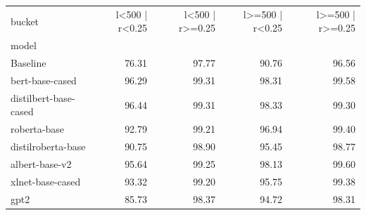 \begin{tabular}{lrrrr}
\toprule
bucket & l<500 | r<0.25 & l<500 | r>=0.25 & l>=500 | r<0.25 & l>=500 | r>=0.25 \\
model &  &  &  &  \\
\midrule
Baseline & 76.31 & 97.77 & 90.76 & 96.56 \\
bert-base-cased & 96.29 & 99.31 & 98.31 & 99.58 \\
distilbert-base-cased & 96.44 & 99.31 & 98.33 & 99.30 \\
roberta-base & 92.79 & 99.21 & 96.94 & 99.40 \\
distilroberta-base & 90.75 & 98.90 & 95.45 & 98.77 \\
albert-base-v2 & 95.64 & 99.25 & 98.13 & 99.60 \\
xlnet-base-cased & 93.32 & 99.20 & 95.75 & 99.38 \\
gpt2 & 85.73 & 98.37 & 94.72 & 98.31 \\
\bottomrule
\end{tabular}
